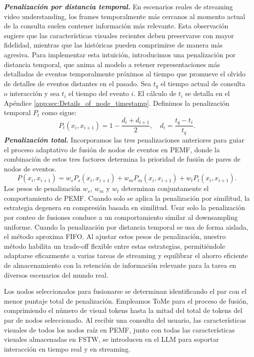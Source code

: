 %
\textbf{\textit{Penalización por distancia temporal.}} En escenarios reales de streaming video understanding, los frames temporalmente más cercanos al momento actual de la consulta suelen contener información más relevante. Esta observación sugiere que las características visuales recientes deben preservarse con mayor fidelidad, mientras que las históricas pueden comprimirse de manera más agresiva. Para implementar esta intuición, introducimos una penalización por distancia temporal, que anima al modelo a retener representaciones más detalladas de eventos temporalmente próximos al tiempo que promueve el olvido de detalles de eventos distantes en el pasado.
%
Sea $t_q$ el tiempo actual de consulta o interacción y sea $t_i$ el tiempo del evento $i$. El cálculo de $t_i$ se detalla en el Apéndice \ref{app:sec:Details_of_node_timestamp}. Definimos la penalización temporal $P_t$ como sigue:
\begin{equation}
P_t(x_i,x_{i+1})=1-\frac{d_i+d_{i+1}}{2},\quad d_i=\frac{t_q-t_i}{t_q}.
\end{equation}
%
\textbf{\textit{Penalización total.}} Incorporamos las tres penalizaciones anteriores para guiar el proceso adaptativo de fusión de nodos de eventos en PEMF, donde la combinación de estos tres factores determina la prioridad de fusión de pares de nodos de eventos.
\begin{equation}
P(x_i,x_{i+1})=w_s P_s(x_i,x_{i+1}) + w_m P_m(x_i,x_{i+1}) + w_t P_t(x_i,x_{i+1}).
\end{equation}
Los pesos de penalización $w_s$, $w_m$ y $w_t$ determinan conjuntamente el comportamiento de PEMF. Cuando solo se aplica la penalización por similitud, la estrategia degenera en compresión basada en similitud. Usar solo la penalización por conteo de fusiones conduce a un comportamiento similar al downsampling uniforme. Cuando la penalización por distancia temporal se usa de forma aislada, el método aproxima FIFO. Al ajustar estos pesos de penalización, nuestro método habilita un trade-off flexible entre estas estrategias, permitiéndole adaptarse eficazmente a varias tareas de streaming y equilibrar el ahorro eficiente de almacenamiento con la retención de información relevante para la tarea en diversos escenarios del mundo real.


Los nodos seleccionados para fusionarse se determinan identificando el par con el menor puntaje total de penalización. Empleamos ToMe \cite{bolya2022tome} para el proceso de fusión, comprimiendo el número de visual tokens hasta la mitad del total de tokens del par de nodos seleccionado. Al recibir una consulta del usuario, las características visuales de todos los nodos raíz en PEMF, junto con todas las características visuales almacenadas en FSTW, se introducen en el LLM para soportar interacción en tiempo real y en streaming.






